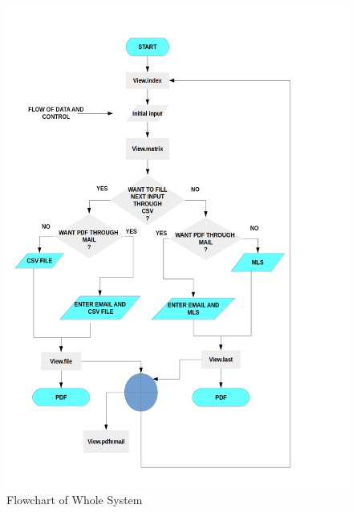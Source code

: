 \begin{figure}[!h]
\centering \includegraphics[scale=0.26]{images/flowchart.png}
\caption{Flowchart of Whole System}
\end{figure}

